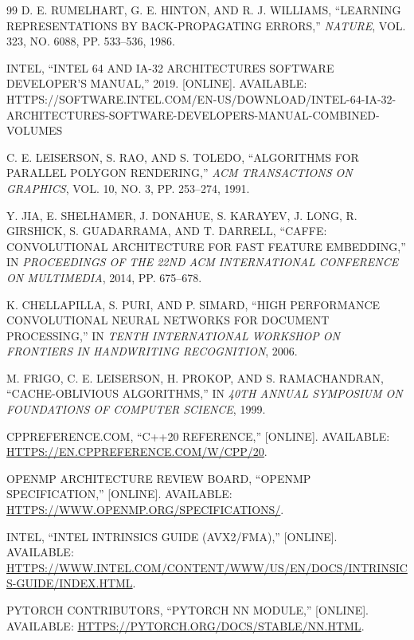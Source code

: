 \documentclass[12pt,oneside,a4paper]{report}
\renewcommand{\cftchapfont}{\normalfont\sffamily\color{black!85}}
\renewcommand{\cftchappagefont}{\normalfont\color{black!85}}
\begin{document}
\begin{thebibliography}{99}
 D. E. RUMELHART, G. E. HINTON, AND R. J. WILLIAMS, ``LEARNING REPRESENTATIONS BY BACK-PROPAGATING ERRORS,'' \textit{NATURE}, VOL. 323, NO. 6088, PP. 533--536, 1986.

 INTEL, ``INTEL 64 AND IA-32 ARCHITECTURES SOFTWARE DEVELOPER'S MANUAL,'' 2019. [ONLINE]. AVAILABLE: HTTPS://SOFTWARE.INTEL.COM/EN-US/DOWNLOAD/INTEL-64-IA-32-ARCHITECTURES-SOFTWARE-DEVELOPERS-MANUAL-COMBINED-VOLUMES

 C. E. LEISERSON, S. RAO, AND S. TOLEDO, ``ALGORITHMS FOR PARALLEL POLYGON RENDERING,'' \textit{ACM TRANSACTIONS ON GRAPHICS}, VOL. 10, NO. 3, PP. 253--274, 1991.

 Y. JIA, E. SHELHAMER, J. DONAHUE, S. KARAYEV, J. LONG, R. GIRSHICK, S. GUADARRAMA, AND T. DARRELL, ``CAFFE: CONVOLUTIONAL ARCHITECTURE FOR FAST FEATURE EMBEDDING,'' IN \textit{PROCEEDINGS OF THE 22ND ACM INTERNATIONAL CONFERENCE ON MULTIMEDIA}, 2014, PP. 675--678.

 K. CHELLAPILLA, S. PURI, AND P. SIMARD, ``HIGH PERFORMANCE CONVOLUTIONAL NEURAL NETWORKS FOR DOCUMENT PROCESSING,'' IN \textit{TENTH INTERNATIONAL WORKSHOP ON FRONTIERS IN HANDWRITING RECOGNITION}, 2006.

 M. FRIGO, C. E. LEISERSON, H. PROKOP, AND S. RAMACHANDRAN, ``CACHE-OBLIVIOUS ALGORITHMS,'' IN \textit{40TH ANNUAL SYMPOSIUM ON FOUNDATIONS OF COMPUTER SCIENCE}, 1999.

 CPPREFERENCE.COM, ``C++20 REFERENCE,'' [ONLINE]. AVAILABLE: \url{HTTPS://EN.CPPREFERENCE.COM/W/CPP/20}.

 OPENMP ARCHITECTURE REVIEW BOARD, ``OPENMP SPECIFICATION,'' [ONLINE]. AVAILABLE: \url{HTTPS://WWW.OPENMP.ORG/SPECIFICATIONS/}.

 INTEL, ``INTEL INTRINSICS GUIDE (AVX2/FMA),'' [ONLINE]. AVAILABLE: \url{HTTPS://WWW.INTEL.COM/CONTENT/WWW/US/EN/DOCS/INTRINSICS-GUIDE/INDEX.HTML}.

 PYTORCH CONTRIBUTORS, ``PYTORCH NN MODULE,'' [ONLINE]. AVAILABLE: \url{HTTPS://PYTORCH.ORG/DOCS/STABLE/NN.HTML}.

\end{thebibliography}

\newpage

\addtocontents{toc}{\protect\renewcommand{\protect\cftchapfont}{\protect\normalfont\protect\sffamily\protect\color{black!85}}}
\addtocontents{toc}{\protect\renewcommand{\protect\cftchappagefont}{\protect\normalfont\protect\color{black!85}}}
\appendix
{}
\end{document}
